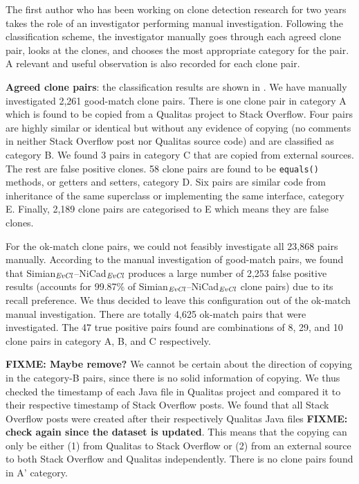 \documentclass{sig-alternate-05-2015}
\newcommand\FIXME[1]{\textbf{FIXME: #1}}
\begin{document}
The first author who has been working on clone detection research for two years takes the role of an investigator performing manual investigation. Following the classification scheme, the investigator manually goes through each agreed clone pair, looks at the clones, and chooses the most appropriate category for the pair. A relevant and useful observation is also recorded for each clone pair. 

\textbf{Agreed clone pairs}: the classification results are shown in . We have manually investigated 2,261 good-match clone pairs. There is one clone pair in category A which is found to be copied from a Qualitas project to Stack Overflow. Four pairs are highly similar or identical but without any evidence of copying (no comments in neither Stack Overflow post nor Qualitas source code) and are classified as category B. We found 3 pairs in category C that are copied from external sources. The rest are false positive clones. 58 clone pairs are found to be \verb|equals()| methods, or getters and setters, category D. Six pairs are similar code from inheritance of the same superclass or implementing the same interface, category E. Finally, 2,189 clone pairs are categorised to E which means they are false clones.

For the ok-match clone pairs, we could not feasibly investigate all 23,868 pairs manually.  According to the manual investigation of good-match pairs, we found that Simian$_{\textrm{\textit{EvCl}}}$--NiCad$_{\textrm{\textit{EvCl}}}$ produces a large number of 2,253 false positive results (accounts for 99.87\% of Simian$_{\textrm{\textit{EvCl}}}$--NiCad$_{\textrm{\textit{EvCl}}}$ clone pairs) due to its recall preference. We thus decided to leave this configuration out of the ok-match manual investigation. There are totally 4,625 ok-match pairs that were investigated. The 47 true positive pairs found are combinations of 8, 29, and 10 clone pairs in category A, B, and C respectively.

\FIXME{Maybe remove?} We cannot be certain about the direction of copying in the category-B pairs, since there is no solid information of copying. We thus checked the timestamp of each Java file in Qualitas project and compared it to their respective timestamp of Stack Overflow posts. We found that all Stack Overflow posts were created after their respectively Qualitas Java files \FIXME{check again since the dataset is updated}. This means that the copying can only be either (1) from Qualitas to Stack Overflow or (2) from an external source to both Stack Overflow and Qualitas independently. There is no clone pairs found in A' category.
\end{document}
